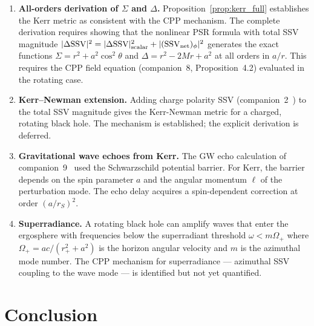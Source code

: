 \documentclass[12pt]{article}
\newcommand{\SSV}{\mathrm{SSV}}
\begin{document}
\begin{enumerate}
  \item \label{op:allorders}
    \textbf{All-orders derivation of $\Sigma$ and $\Delta$.}
    Proposition~\ref{prop:kerr_full} establishes the Kerr metric as
    consistent with the CPP mechanism.  The complete derivation requires
    showing that the nonlinear PSR formula with total SSV magnitude
    $|\Delta\SSV|^2 = |\Delta\SSV|_{\rm scalar}^2 +
    |(\SSV_{\rm net})_\phi|^2$ generates the exact functions
    $\Sigma = r^2 + a^2\cos^2\theta$ and $\Delta = r^2 - 2Mr + a^2$
    at all orders in $a/r$.  This requires the CPP field equation
    (companion~8, Proposition~4.2) evaluated in the rotating case.

  \item \textbf{Kerr--Newman extension.}
    Adding charge polarity SSV (companion~2~\cite{c2}) to the total
    SSV magnitude gives the Kerr-Newman metric for a charged, rotating
    black hole.  The mechanism is established; the explicit derivation
    is deferred.

  \item \textbf{Gravitational wave echoes from Kerr.}
    The GW echo calculation of companion~9~\cite{c9} used the
    Schwarzschild potential barrier.  For Kerr, the barrier depends
    on the spin parameter $a$ and the angular momentum $\ell$ of the
    perturbation mode.  The echo delay acquires a spin-dependent
    correction at order $(a/r_S)^2$.

  \item \textbf{Superradiance.}
    A rotating black hole can amplify waves that enter the ergosphere
    with frequencies below the superradiant threshold
    $\omega < m\Omega_+$ where $\Omega_+ = ac/(r_+^2 + a^2)$ is the
    horizon angular velocity and $m$ is the azimuthal mode number.
    The CPP mechanism for superradiance — azimuthal SSV coupling to
    the wave mode — is identified but not yet quantified.
\end{enumerate}

\section{Conclusion}
\label{sec:conclusion}
\end{document}
